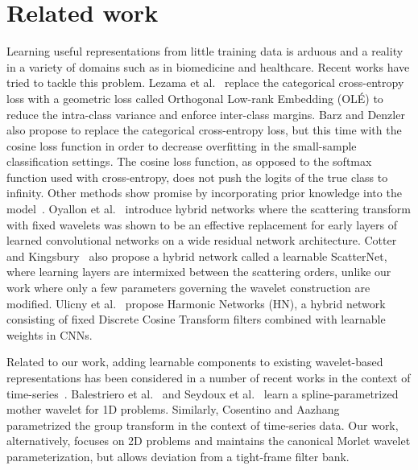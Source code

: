 \documentclass[10pt,twocolumn,letterpaper]{article}
\begin{document}
\section{Related work}
\label{sec:relatedwork}
Learning useful representations from little training data \cite{learnfewsamples} is arduous and a reality in a variety of domains such as in biomedicine and healthcare. 
Recent works have tried to tackle this problem. Lezama et al.~\cite{lezama2018ole} replace the categorical cross-entropy loss with a geometric loss called Orthogonal Low-rank Embedding (OLÉ) to reduce the intra-class variance and enforce inter-class margins. Barz and Denzler~\cite{barz2020deep} also propose to replace the categorical cross-entropy loss, but this time with the cosine loss function in order to decrease overfitting in the small-sample classification settings. The cosine loss function, as opposed to the softmax function used with cross-entropy, does not push the logits of the true class to infinity.
Other methods show promise by incorporating prior knowledge into the model~\cite{Gens_2014_NIPS, Jacobsen_2016_CVPR, bruintjes2021vipriors, Kayhan_2020_CVPR, brigato2021tune}. Oyallon et al.~\cite{oyallon2018replearning} introduce hybrid networks where the scattering transform with fixed wavelets was shown to be an effective replacement for early layers of learned convolutional networks on a wide residual network architecture. 
Cotter and Kingsbury~\cite{cotter2019learnable} also propose a hybrid network called a learnable ScatterNet, where learning layers are intermixed between the scattering orders, unlike our work where only a few parameters governing the wavelet construction are modified.  Ulicny et al.~\cite{8902831} propose Harmonic Networks (HN), a hybrid network consisting of fixed Discrete Cosine Transform filters combined with learnable weights in CNNs. 


Related to our work, adding learnable components to existing wavelet-based representations has been considered in a number of recent works in the context of time-series~\cite{balestriero2018spline, seydoux2020clustering, cosentino2020learnable, balestriero2020interpretable}. Balestriero et al.~\cite{balestriero2018spline} and Seydoux et al.~\cite{seydoux2020clustering} learn a spline-parametrized mother wavelet for 1D problems. Similarly, Cosentino and Aazhang~\cite{cosentino2020learnable} parametrized the group transform in the context of time-series data. Our work, alternatively, focuses on 2D problems and maintains the canonical Morlet wavelet parameterization, but allows deviation from a tight-frame filter bank.
\end{document}
